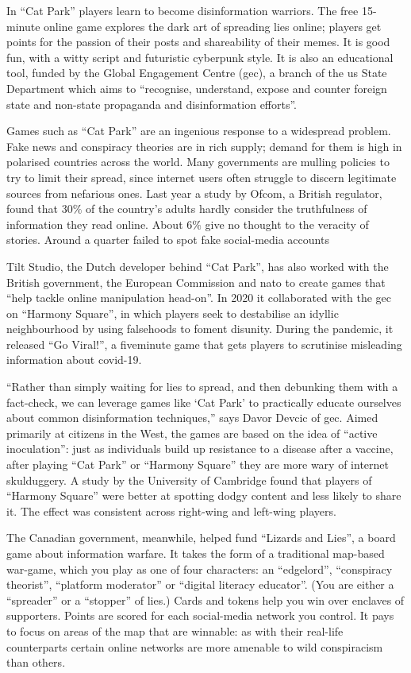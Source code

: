 \documentclass[10pt, a4paper, oneside]{article}
\begin{document}
\begin{spacing}{2.0}
In “Cat Park” players learn to become disinformation warriors. The free 15-minute online game explores the
dark art of spreading lies online; players get points for the passion of their posts and shareability of their memes. 
It is good fun, with a witty script and futuristic cyberpunk style. It is also an educational tool, funded by the Global 
Engagement Centre (gec), a branch of the us State Department which aims to “recognise, understand, expose and counter foreign 
state and non-state propaganda and disinformation efforts”.

Games such as “Cat Park” are an ingenious response to a widespread problem. Fake news and conspiracy
theories are in rich supply; demand for them is high in polarised countries across the world. Many governments are 
mulling policies to try to limit their spread, since internet users often struggle to discern legitimate sources from nefarious ones. 
Last year a study by Ofcom, a British regulator, found that 30$\%$ of the country's adults hardly consider the truthfulness of 
information they read online. About $6\%$ give no thought to the veracity of stories. Around a quarter 
failed to spot fake social-media accounts

Tilt Studio, the Dutch developer behind “Cat Park”, has also worked with the British government, the
European Commission and nato to create games that “help tackle online manipulation head-on”. In 2020 it
collaborated with the gec on “Harmony Square”, in which players seek to destabilise an idyllic 
neighbourhood by using falsehoods to foment disunity. During the pandemic, it released “Go Viral!”, 
a fiveminute game that gets players to scrutinise misleading information about covid-19.

“Rather than simply waiting for lies to spread, and then debunking them with a fact-check, we can leverage
games like ‘Cat Park' to practically educate ourselves about common disinformation techniques,” says Davor
Devcic of gec. Aimed primarily at citizens in the West, the games are based on the idea of “active inoculation”: 
just as individuals build up resistance to a disease after a vaccine, after playing “Cat Park” or “Harmony Square” 
they are more wary of internet skulduggery. A study by the University of Cambridge found that players of “Harmony Square” 
were better at spotting dodgy content and less likely to share it. The effect was consistent across right-wing and left-wing players.

The Canadian government, meanwhile, helped fund “Lizards and Lies”, a board game about information
warfare. It takes the form of a traditional map-based war-game, which you play as one of four characters: an “edgelord”, 
“conspiracy theorist”, “platform moderator” or “digital literacy educator”. (You are either a “spreader” or a “stopper” of lies.) 
Cards and tokens help you win over enclaves of supporters. Points are scored for each social-media network you control. It pays to 
focus on areas of the map that are winnable: as with their real-life counterparts certain online networks are more amenable to wild 
conspiracism than others.



\end{spacing}
\end{document}
